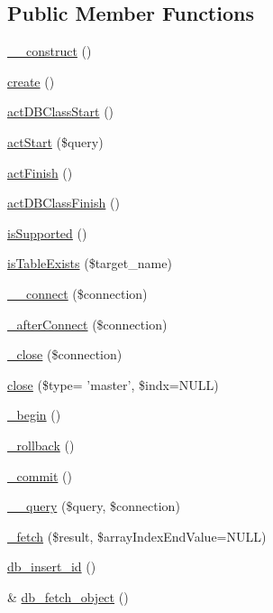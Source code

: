 \subsection*{Public Member Functions}
\begin{DoxyCompactItemize}
\item 
\hyperlink{classDBMssqlConnectWrapper_ae43eae566401b6cc86ed52b15cccb2fc}{\+\_\+\+\_\+construct} ()
\item 
\hyperlink{classDBMssqlConnectWrapper_aa99e9c158ff6a934846c4cbe78cf1fb9}{create} ()
\item 
\hyperlink{classDBMssqlConnectWrapper_acdf79efc55820a01e4cf46b0455dd114}{act\+D\+B\+Class\+Start} ()
\item 
\hyperlink{classDBMssqlConnectWrapper_a291f4a12d2b1a34afe43ef9fcf107fa6}{act\+Start} (\$query)
\item 
\hyperlink{classDBMssqlConnectWrapper_abffa032a2e7453fe3c6c9c69ff410416}{act\+Finish} ()
\item 
\hyperlink{classDBMssqlConnectWrapper_a6a5d599505b98c34564b59e126d8ce34}{act\+D\+B\+Class\+Finish} ()
\item 
\hyperlink{classDBMssqlConnectWrapper_a7a0cc62ccdecaf8eed78596fa466dade}{is\+Supported} ()
\item 
\hyperlink{classDBMssqlConnectWrapper_ad17b08e049ccffbac0b48d0796d91f76}{is\+Table\+Exists} (\$target\+\_\+name)
\item 
\hyperlink{classDBMssqlConnectWrapper_ad6bf1ddce3406a3dabea760f18889669}{\+\_\+\+\_\+connect} (\$connection)
\item 
\hyperlink{classDBMssqlConnectWrapper_aa718d165b861301a243516580eecfdad}{\+\_\+after\+Connect} (\$connection)
\item 
\hyperlink{classDBMssqlConnectWrapper_a1920c9ad3f1035a11a1c6bef3c18db19}{\+\_\+close} (\$connection)
\item 
\hyperlink{classDBMssqlConnectWrapper_a7f82a3065df404a8bc669027601544ca}{close} (\$type= 'master', \$indx=N\+U\+L\+L)
\item 
\hyperlink{classDBMssqlConnectWrapper_a7b18c505976eb12aecd3401bf8be3a5d}{\+\_\+begin} ()
\item 
\hyperlink{classDBMssqlConnectWrapper_a32aee54f58f3cb0b5da869df8cda21ec}{\+\_\+rollback} ()
\item 
\hyperlink{classDBMssqlConnectWrapper_af17c55d0306452fbf12de5bf478ac558}{\+\_\+commit} ()
\item 
\hyperlink{classDBMssqlConnectWrapper_a41af30efc2cb554d8d5d69a24bda6fa2}{\+\_\+\+\_\+query} (\$query, \$connection)
\item 
\hyperlink{classDBMssqlConnectWrapper_a2ac0ca2486b85984e3ac396dd3a2fa95}{\+\_\+fetch} (\$result, \$array\+Index\+End\+Value=N\+U\+L\+L)
\item 
\hyperlink{classDBMssqlConnectWrapper_a561f05fa4f364814f00d0741a87eafab}{db\+\_\+insert\+\_\+id} ()
\item 
\& \hyperlink{classDBMssqlConnectWrapper_ab02bc152f67c78e3c4e87a7a480700ee}{db\+\_\+fetch\+\_\+object} ()
\end{DoxyCompactItemize}
